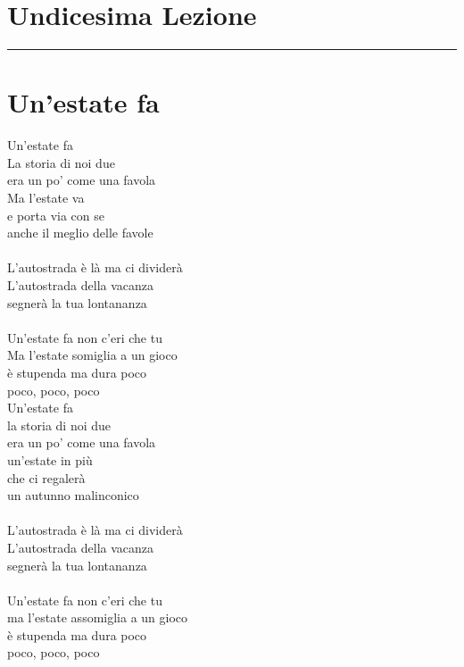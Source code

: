 \documentclass[letter,11pt]{article}
\begin{document}
\section*{\Large{Undicesima Lezione}}
\noindent\rule{16cm}{1pt}

\setlength{\parindent}{260pt}

\vskip 0.2in
\section*{Un'estate fa}
\vskip 0.2in

\begin{multicols}{2}
\noindent Un'estate fa \\
La storia di noi due \\
era un po' come una favola \\
Ma l'estate va \\
e porta via con se \\
anche il meglio delle favole \\
\\
L'autostrada è là ma ci dividerà \\
L'autostrada della vacanza \\
segnerà la tua lontananza \\
\\
Un'estate fa non c'eri che tu \\
Ma l'estate somiglia a un gioco \\
è stupenda ma dura poco \\
poco, poco, poco \\
Un'estate fa \\
la storia di noi due \\
era un po' come una favola \\
un'estate in più \\
che ci regalerà \\
un autunno malinconico \\
\\
L'autostrada è là ma ci dividerà \\
L'autostrada della vacanza \\
segnerà la tua lontananza \\
\\
Un'estate fa non c'eri che tu \\
ma l'estate assomiglia a un gioco \\
è stupenda ma dura poco \\
poco, poco, poco \\
\\

\end{multicols}
\end{document}
